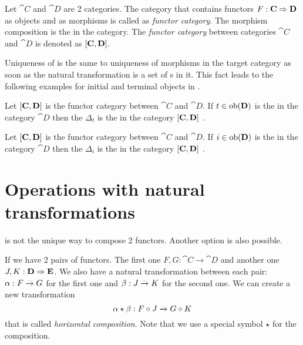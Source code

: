 \begin{definition}
\label{def:funcategory}
Let $\cat{C}$ and $\cat{D}$ are 2 categories. The category that
contains functors $F: \mathbf{C} \Rightarrow \mathbf{D}$ as objects and
 as morphisms is called as \textit{functor
  category}. The morphism composition is the
 in the category.  The \textit{functor
category} between categories $\cat{C}$ and $\cat{D}$ is denoted as
$[\mathbf{C}, \mathbf{D}]$. 
\end{definition}

Uniqueness of  is the same to uniqueness of morphisms in the
target category as soon as the natural transformation is a set of
s in it. This fact leads to the following
examples for initial and terminal objects in .

\begin{example}
  \label{ex:terminal_object_fun}
  Let $[\mathbf{C}, \mathbf{D}]$ is the functor category between $\cat{C}$
  and $\cat{D}$. If $t \in \mathrm{ob}(\mathbf{D})$ is the
   in the category $\cat{D}$ then 
  the 
   $\Delta_t$ is the
   in the category $[\mathbf{C}, \mathbf{D}]$
  \cite{bib:stackexchange:initial_terminal_in_fun_category}. 
\end{example}

\begin{example}
  \label{ex:initial_object_fun}
  Let $[\mathbf{C}, \mathbf{D}]$ is the functor category between $\cat{C}$
  and $\cat{D}$. If $i \in \mathrm{ob}(\mathbf{D})$ is the
   in the category $\cat{D}$ then 
  the 
   $\Delta_i$ is the
   in the category $[\mathbf{C}, \mathbf{D}]$
  \cite{bib:stackexchange:initial_terminal_in_fun_category}. 
\end{example}


\section{Operations with natural transformations}

 is not the unique way to compose
2 functors. Another option is also possible. 

\begin{definition}
\label{def:horizontal_composition}
If we have 2 pairs of functors. The first one $F,G: \cat{C} \to
\cat{D}$ and another one $J,K: \mathbf{D} \Rightarrow \mathbf{E}$. We also have a
natural transformation between each pair: $\alpha : F \xrightarrow{.}
G$ for the first one and $\beta : J \xrightarrow{.}
K$ for the second one. We can create a new transformation
\[
\alpha \star \beta: F \circ J \xrightarrow{.} G \circ K
\] 
that is called \textit{horizontal composition}. Note that we use a
special symbol $\star$ for the composition.
\end{definition}

